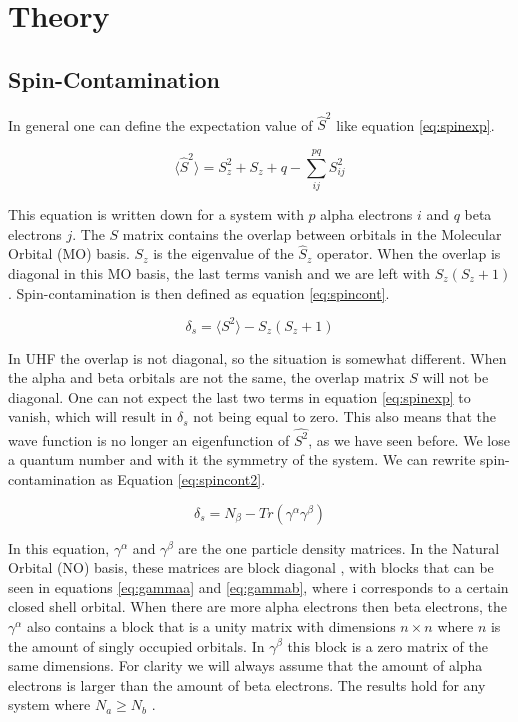 \documentclass[twoside,twocolumn,9pt]{article}
\begin{document}
\section{Theory}
\subsection{Spin-Contamination}
\label{subsec:spinconttheory}
In general one can define the expectation value of $\hat{S}^2$ like equation \eqref{eq:spinexp}\cite{Andrews1991}.

\begin{equation}\label{eq:spinexp}
  \langle \hat{S}^2 \rangle = S_z^2 + S_z + q - \sum_{ij}^{pq} S_{ij}^2
\end{equation}

This equation is written down for a system with $p$ alpha electrons $i$ and $q$ beta electrons $j$. The $S$ matrix contains the overlap between orbitals in the Molecular Orbital (MO)
basis. $S_z$ is the eigenvalue of the $\hat{S}_z$ operator. When the overlap is diagonal in this MO basis, the last terms vanish and we are left with $S_z(S_z + 1)$.
Spin-contamination is then defined as equation \eqref{eq:spincont}.

\begin{equation}\label{eq:spincont}
  \delta_s = \langle S^2 \rangle - S_z(S_z + 1)
\end{equation}

In UHF the overlap is not diagonal, so the situation is somewhat different. When the alpha and beta orbitals are not the same, the overlap matrix $S$ will not be diagonal. One can not
expect the last two terms in equation \eqref{eq:spinexp} to vanish, which will result in $\delta_s$ not being equal to zero. This also means that the wave function is no longer an
eigenfunction of $\hat{S^2}$, as we have seen before. We lose a quantum number and with it the symmetry of the system. We can rewrite spin-contamination as Equation
\eqref{eq:spincont2}\cite{Savin2010}.

\begin{equation}\label{eq:spincont2}
  \delta_s = N_\beta - Tr(\gamma^\alpha\gamma^\beta)
\end{equation}

In this equation, $\gamma^{\alpha}$ and $\gamma^\beta$ are the one particle density matrices. In the Natural Orbital (NO) basis, these matrices are block diagonal
\cite{Scuseria2010}, with blocks that can be seen in equations \eqref{eq:gammaa} and \eqref{eq:gammab}, where i corresponds to a certain closed shell orbital. When there are more
alpha electrons then beta electrons,
the $\gamma^\alpha$ also contains a block that is a unity matrix with dimensions $n\times n$ where $n$ is the amount of singly occupied orbitals. In $\gamma^\beta$ this block is a
zero matrix of the same dimensions. For clarity we will always assume that the amount of alpha electrons is larger than the amount of beta electrons. The results hold for any system
where $N_a \geq N_b $ \cite{Scuseria2010}.
\end{document}
